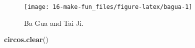 \documentclass[]{book}
\newenvironment{Shaded}{\begin{snugshade}}{\end{snugshade}}
\newcommand{\KeywordTok}[1]{\textcolor[rgb]{0.13,0.29,0.53}{\textbf{#1}}}
\newcommand{\NormalTok}[1]{#1}
\theoremstyle{definition}
\theoremstyle{definition}
\theoremstyle{remark}
\begin{document}
\begin{figure}

{\centering \texttt{[image: 16-make-fun\_files/figure-latex/bagua-1]} 

}

\caption{Ba-Gua and Tai-Ji.}\label{fig:bagua}
\end{figure}

\begin{Shaded}
\begin{Highlighting}[]
\KeywordTok{circos.clear}\NormalTok{()}
\end{Highlighting}
\end{Shaded}


\end{document}
